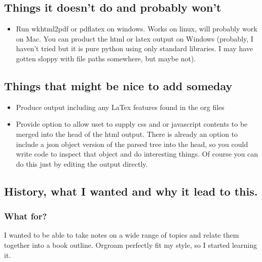 \documentclass[11pt]{article}
\begin{document}
\subsection{Things it doesn't do and probably won't  }
 \label{obj-167}
 \label{obj-166}
\begin{itemize}
\item
Run wkhtml2pdf or pdflatex on windows. Works on linux, will probably work on Mac. You can
  product the html or latex output on Windows (probably, I haven't tried but it is pure python using only
  standard libraries. I may have gotten sloppy with file paths somewhere, but maybe not).

\end{itemize}
\subsection{Things that might be nice to add someday  }
 \label{obj-176}
 \label{obj-175}
\begin{itemize}
\item
Produce output including any LaTex features found in the org files
\item
Provide option to allow uset to supply css and or javascript contents to
  be merged into the head of the html output. There is already an option
  to include a json object version of the parsed tree into the head, so
  you could write code to inspect that object and do interesting things.
  Of course you can do this just by editing the output directly.

\end{itemize}
\subsection{History, what I wanted and why it lead to this.  }
 \label{obj-189}
 \label{obj-188}
\subsubsection{What for?  }
 \label{obj-192}
 \label{obj-191}
  I wanted to be able to take notes on a wide range of topics and relate them together
  into a book outline. Orgroam perfectly fit my style, so I started learning it.
\end{document}

